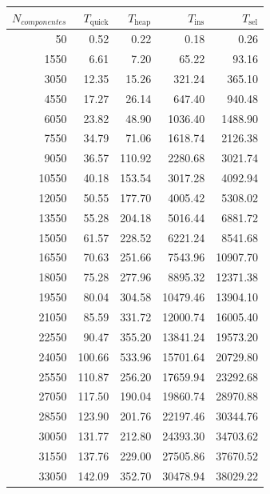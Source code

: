 \documentclass{homework}
\begin{document}
    \begin{table}[H]
        \footnotesize
        \centering
        \begin{tabular}{|r|r|r|r|r|}
            \hline
            $N_{componentes}$ & $T_{\text{quick}}$ & $T_{\text{heap}}$ & $T_{\text{ins}}$ & $T_{\text{sel}}$ \\
            \hline
            50 & 0.52 & 0.22 & 0.18 & 0.26 \\ 
            1550 & 6.61 & 7.20 & 65.22 & 93.16 \\ 
            3050 & 12.35 & 15.26 & 321.24 & 365.10 \\ 
            4550 & 17.27 & 26.14 & 647.40 & 940.48 \\ 
            6050 & 23.82 & 48.90 & 1036.40 & 1488.90 \\ 
            7550 & 34.79 & 71.06 & 1618.74 & 2126.38 \\ 
            9050 & 36.57 & 110.92 & 2280.68 & 3021.74 \\ 
            10550 & 40.18 & 153.54 & 3017.28 & 4092.94 \\ 
            12050 & 50.55 & 177.70 & 4005.42 & 5308.02 \\ 
            13550 & 55.28 & 204.18 & 5016.44 & 6881.72 \\ 
            15050 & 61.57 & 228.52 & 6221.24 & 8541.68 \\ 
            16550 & 70.63 & 251.66 & 7543.96 & 10907.70 \\ 
            18050 & 75.28 & 277.96 & 8895.32 & 12371.38 \\ 
            19550 & 80.04 & 304.58 & 10479.46 & 13904.10 \\ 
            21050 & 85.59 & 331.72 & 12000.74 & 16005.40 \\ 
            22550 & 90.47 & 355.20 & 13841.24 & 19573.20 \\ 
            24050 & 100.66 & 533.96 & 15701.64 & 20729.80 \\ 
            25550 & 110.87 & 256.20 & 17659.94 & 23292.68 \\ 
            27050 & 117.50 & 190.04 & 19860.74 & 28970.88 \\ 
            28550 & 123.90 & 201.76 & 22197.46 & 30344.76 \\ 
            30050 & 131.77 & 212.80 & 24393.30 & 34703.62 \\ 
            31550 & 137.76 & 229.00 & 27505.86 & 37670.52 \\ 
            33050 & 142.09 & 352.70 & 30478.94 & 38029.22 \\ 

\end{tabular}
\end{table}
\end{document}
